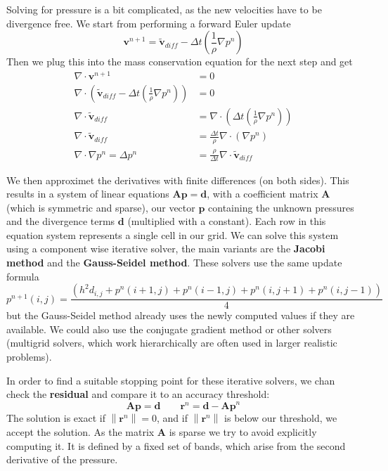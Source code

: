 \documentclass{article}
\newcommand{\norm}[1]{\left\lVert#1\right\rVert}
\begin{document}
Solving for pressure is a bit complicated, as the new velocities have to be divergence free.
We start from performing a forward Euler update
\begin{equation}
    \bm{v}^{n+1} = \bm{\tilde{v}}_{diff} - \Delta t ( \frac{1}{\rho} \nabla p^n)
\end{equation}
Then we plug this into the mass conservation equation for the next step and get
\begin{align}
    \nabla \cdot \bm{v}^{n+1} &= 0\\
    \nabla \cdot (\bm{\tilde{v}}_{diff} - \Delta t(\frac{1}{\rho} \nabla p^n)) &= 0\\
    \nabla \cdot \bm{\tilde{v}}_{diff} &= \nabla \cdot (\Delta t(\frac{1}{\rho} \nabla p^n))\\
    \nabla \cdot \bm{\tilde{v}}_{diff} &= \frac{\Delta t}{\rho} \nabla \cdot (\nabla p^n)\\
    \nabla \cdot \nabla p^n = \Delta p^n &= \frac{\rho}{\Delta t} \nabla \cdot \bm{\tilde{v}}_{diff}
\end{align}

We then approximet the derivatives with finite differences (on both sides).
This results in a system of linear equations $\bm{Ap} = \bm{d}$, with a coefficient matrix $\bm{A}$ (which is symmetric and sparse), our vector $\bm{p}$ containing the unknown pressures and the divergence terms $\bm{d}$ (multiplied with a constant).
Each row in this equation system represents a single cell in our grid.
We can solve this system using a component wise iterative solver, the main variants are the \textbf{Jacobi method} and the \textbf{Gauss-Seidel method}.
These solvers use the same update formula
\begin{equation}
    p^{n+1}(i,j) = \frac{(h^2 d_{i,j} + p^n(i+1,j) + p^n(i-1,j) + p^n(i,j+1) + p^n(i,j-1))}{4}
\end{equation}
but the Gauss-Seidel method already uses the newly computed values if they are available.
We could also use the conjugate gradient method or other solvers (multigrid solvers, which work hierarchically are often used in larger realistic problems).

In order to find a suitable stopping point for these iterative solvers, we chan check the \textbf{residual} and compare it to an accuracy threshold:
\begin{equation}
    \bm{Ap} = \bm{d} \qquad \bm{r}^n = \bm{d} - \bm{Ap}^n
\end{equation}
The solution is exact if $\norm{\bm{r}^n} = 0$, and if $\norm{\bm{r}^n}$ is below our threshold, we accept the solution.
As the matrix $\bm{A}$ is sparse we try to avoid explicitly computing it.
It is defined by a fixed set of bands, which arise from the second derivative of the pressure.
\end{document}
